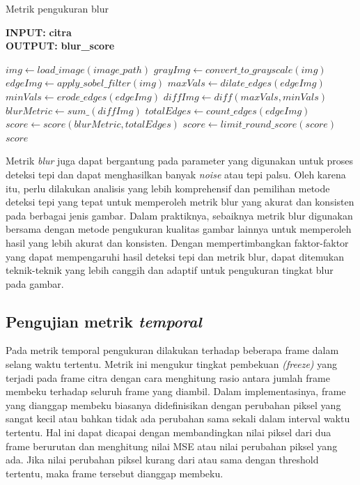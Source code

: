 \begin{algorithm}
	\caption{Metrik pengukuran blur}
	\label{metrik-blur}
	\begin{flushleft}
		\textbf{INPUT:} \textbf{citra}\\
		\textbf{OUTPUT:}	\textbf{blur\_score}
	\end{flushleft}
	
	\begin{algorithmic}[1]
		\State $img \gets load\_image(image\_path)$ 
		\State $grayImg \gets convert\_to\_grayscale(img)$ 
		\State $edgeImg \gets apply\_sobel\_filter(img)$ 
		\State $maxVals \gets dilate\_edges(edgeImg)$ 
		\State $minVals \gets erode\_edges(edgeImg)$ 
		\State $diffImg \gets diff(maxVals, minVals)$ 
		\State $blurMetric \gets sum\_(diffImg)$ 
		\State $totalEdges \gets count\_edges(edgeImg)$ 
		\State $score \gets score(blurMetric, totalEdges)$ 
		\State $score \gets limit\_round\_score(score)$ 
		\State \Return $score$
		\EndFunction
	\end{algorithmic}
\end{algorithm}

Metrik \textit{blur} juga dapat bergantung pada parameter yang digunakan untuk proses deteksi tepi dan dapat menghasilkan banyak \textit{noise} atau tepi palsu. Oleh karena itu, perlu dilakukan analisis yang lebih komprehensif dan pemilihan metode deteksi tepi yang tepat untuk memperoleh metrik blur yang akurat dan konsisten pada berbagai jenis gambar. Dalam praktiknya, sebaiknya metrik blur digunakan bersama dengan metode pengukuran kualitas gambar lainnya untuk memperoleh hasil yang lebih akurat dan konsisten. Dengan mempertimbangkan faktor-faktor yang dapat mempengaruhi hasil deteksi tepi dan metrik blur, dapat ditemukan teknik-teknik yang lebih canggih dan adaptif untuk pengukuran tingkat blur pada gambar.

\subsection{Pengujian metrik \textit{temporal}}
\hspace{1,2cm}
Pada metrik temporal pengukuran dilakukan terhadap beberapa frame dalam selang waktu tertentu. Metrik ini mengukur tingkat pembekuan \textit{(freeze)} yang terjadi pada frame citra dengan cara menghitung rasio antara jumlah frame membeku terhadap seluruh frame yang diambil. Dalam implementasinya, frame yang dianggap membeku biasanya didefinisikan dengan perubahan piksel yang sangat kecil atau bahkan tidak ada perubahan sama sekali dalam interval waktu tertentu. Hal ini dapat dicapai dengan membandingkan nilai piksel dari dua frame berurutan dan menghitung nilai MSE atau nilai perubahan piksel yang ada. Jika nilai perubahan piksel kurang dari atau sama dengan threshold tertentu, maka frame tersebut dianggap membeku.

